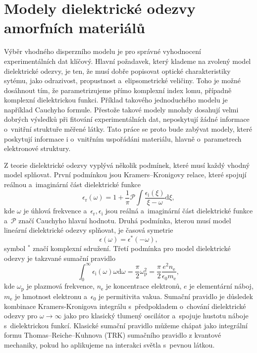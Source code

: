 \chapter{Modely dielektrické odezvy amorfních materiálů}

Výběr vhodného disperzního modelu je pro správné vyhodnocení experimentálních dat klíčový. Hlavní požadavek, který klademe na zvolený model dielektrické odezvy, je ten, že musí dobře popisovat optické charakteristiky sytému, jako odrazivost, propustnost a~elipsometrické veličiny. Toho je možné dosáhnout tím, že parametrizujeme přímo komplexní index lomu, případně komplexní dielektrickou funkci. 
Příklad takového jednoduchého mo\-delu je například Cauchyho formule. 
Přestože takové modely mnohdy dosahují velmi dobrých výsledků při fitování experimentálních dat, neposkytují žádné informace o~vnitřní struktuře měřené látky. Tato práce se proto bude zabývat modely, které poskytují informace i o~vnitřním uspořádáni materiálu, hlavně o~parametrech elektronové struktury.

Z teorie dielektrické odezvy vyplývá několik podmínek, které musí každý vhodný model splňovat. První podmínkou jsou Kramers--Kronigovy relace, které spojují reálnou a~ima\-gi\-nární část dielektrické funkce  
\begin{equation}
\epsilon_\mathrm{r}(\omega) = 1 + \frac{1}{\pi} \mathcal{P} \int \frac{\epsilon_\mathrm{i}(\xi)}{\xi - \omega} \mathrm{d}\xi \mathrm{,}
\label{KKint}
\end{equation}
kde $\omega$ je úhlová frekvence a~$\epsilon_\mathrm{r}, \epsilon_\mathrm{i}$ jsou reálná a~imaginární část dielektrické funkce a~$\mathcal{P}$ značí Cauchyho hlavní hodnotu. 
%
Druhá podmínka, kterou musí model lineární dielektrické odezvy splňovat, je časová symetrie
\begin{equation}
\epsilon(\omega) =\epsilon^* (-\omega) \mathrm{,}
\label{casovasymetrie}
\end{equation}
symbol $^*$ značí komplexní sdružení.
%
Třetí podmínka pro model dielektrické odezvy je takzvané sumační pravidlo
\begin{equation}
\int_0^\infty \epsilon_\mathrm{i} (\omega) \omega \mathrm{d} \omega = \frac{\pi}{2} \omega_\mathrm{p}^2 = \frac{\pi}{2} \frac{e^2 n_\mathrm{e}}{ \epsilon_0 m_\mathrm{e}} \mathrm{,}
\end{equation}
kde $\omega_\mathrm{p}$ je plazmová frekvence, $n_\mathrm{e}$ je koncentrace elektronů, $e$ je elementární náboj, $m_\mathrm{e}$ je hmotnost elektronu a~$\epsilon_0$ je permitivita vakua. Sumační pravidlo je důsledek kombinace Kramers-Kronigova integrálu s~předpokladem o~chování dielektrické odezvy pro $\omega \rightarrow \infty$ jako pro klasický tlumený oscilátor a~spojuje hustotu náboje s~dielektrickou funkcí. Klasické sumační pravidlo můžeme chápat jako integrální formu Thomas--Reiche--Kuhnova (TRK) sumačního pravidlo z kvantové mechaniky, pokud ho aplikujeme na interakci světla s~pevnou látkou.  

